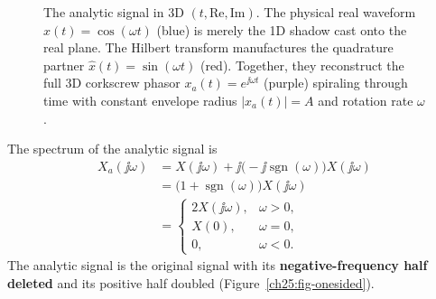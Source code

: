 \begin{figure}[H]
\caption{The analytic signal in 3D $(t, \text{Re}, \text{Im})$. The physical real waveform $x(t) = \cos(\omega t)$ (blue) is merely the 1D shadow cast onto the real plane. The Hilbert transform manufactures the quadrature partner $\hat{x}(t) = \sin(\omega t)$ (red). Together, they reconstruct the full 3D corkscrew phasor $x_a(t) = e^{\jj\omega t}$ (purple) spiraling through time with constant envelope radius $|x_a(t)| = A$ and rotation rate $\omega$.}
\label{ch25:fig-helix}
\end{figure}

The spectrum of the
analytic signal is
\begin{equation}
\label{ch25:analytic-spectrum}
\begin{split}
X_a(\jj\omega) &= X(\jj\omega) + \jj\big(-\jj\operatorname{sgn}(\omega)\big)X(\jj\omega) \\
              &= \big(1 + \operatorname{sgn}(\omega)\big)X(\jj\omega) \\
              &= \begin{cases} 2X(\jj\omega), & \omega>0,\\ X(0), & \omega=0,\\ 0, & \omega<0.\end{cases}
\end{split}
\end{equation}
The analytic signal is the original signal with its \textbf{negative-frequency half deleted}
and its positive half doubled (Figure~\ref{ch25:fig-onesided}).

